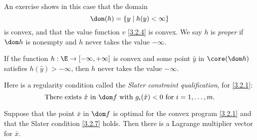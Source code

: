 \documentclass[../borwein-lewis_notes.tex]{subfiles}
\begin{document}
An exercise shows in this case that the domain 
\begin{equation*}
\dom(h) = \{y\mid h(y)<\infty\}
\end{equation*}
is convex, and that the value function $v$ \eqref{3.2.4} is convex. 
We say $h$ is \textit{proper} if $\dom h$ is nonempty and $h$ never 
takes the value $-\infty$.
\begin{lemma}[3.2.6]
If the function $h:\E\to[-\infty, +\infty]$ is convex and some point 
$\hat y$ in $\core(\dom h)$ satisfies $h(\hat y)>-\infty$, then $h$ 
never takes the value $-\infty$.
\label{3.2.6}
\end{lemma}
Here is a regularity condition called the \textit{Slater constraint 
qualification}, for \eqref{3.2.1}:
\begin{equation}
\text{There exists }\hat x\text{ in }\dom f\text{ with }g_i(\hat x)<0
\text{ for }i=1,\ldots, m.
\label{3.2.7}
\end{equation}
\begin{theorem}
Suppose that the point $\bar x$ in $\dom f$ is optimal for the convex 
program \eqref{3.2.1} and that the Slater condition \eqref{3.2.7} 
holds. Then there is a Lagrange multiplier vector for $\bar x$.
\label{3.2.8}
\end{theorem}
\end{document}
